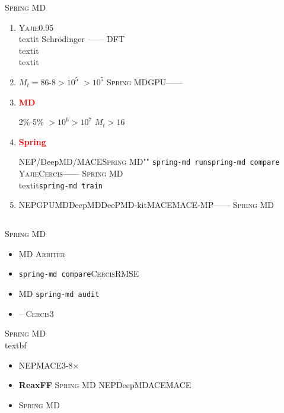 \documentclass[12pt,a4paper]{article}
\theoremstyle{remark}
\newcommand{\Yajie}{\textsc{Yajie}}
\newcommand{\Cercis}{\textsc{Cercis}}
\newcommand{\Arbiter}{\textsc{Arbiter}}
\newcommand{\SpringMD}{\textsc{Spring MD}}
\newcommand{\honestcrit}[1]{%
    \textcolor{red}{\textbf{#1}}%
}
\begin{document}
\SpringMD{}

\begin{enumerate}[label=\textbf{ \arabic*},leftmargin=*,itemsep=6pt]
    \item \honestcrit{}
    \Yajie{}0.95\\textit{}
    Schrödinger
    ——
    DFT
    \\textit{}
    \\textit{}

    \item \honestcrit{}
    $M_t=8$6-8$>10^5$
    $>10^5$
    \SpringMD{}GPU——

    \item \honestcrit{MD}
    2\%-5\%
    $>10^6$$>10^7$
    $M_t$$>16$

    \item \honestcrit{Spring}
    NEP/DeepMD/MACE\SpringMD{}""
    \texttt{spring-md run}\texttt{spring-md compare}
    \Yajie{}\Cercis{}——
    \SpringMD{}\\textit{}\texttt{spring-md train}

    \item \honestcrit{}
    NEPGPUMDDeepMDDeePMD-kitMACEMACE-MP——
    \SpringMD{}
\end{enumerate}

\subsection{}

\SpringMD{}

\begin{itemize}[itemsep=3pt]
    \item \textbf{} MD
    \Arbiter{}

    \item \textbf{} 
    \texttt{spring-md compare}\Cercis{}RMSE

    \item \textbf{} MD
    \texttt{spring-md audit}

    \item \textbf{} --
    \Cercis{}3
\end{itemize}

\SpringMD{}\\textbf{}

\begin{itemize}[itemsep=3pt]
    \item \textbf{} 
    NEPMACE3-8×

    \item \textbf{ReaxFF} \SpringMD{}
    NEPDeepMDACEMACE

    \item \textbf{} \SpringMD{}
\end{itemize}
\end{document}
